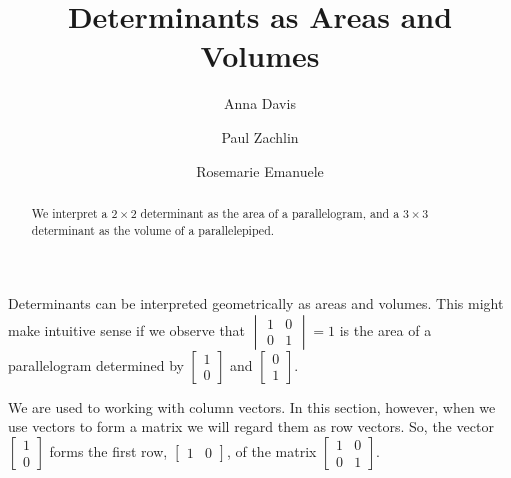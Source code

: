 \documentclass{ximera}
\author{Anna Davis \and Paul Zachlin \and Rosemarie Emanuele} \title{Determinants as Areas and Volumes} \license{CC-BY 4.0}
\begin{document}
\begin{abstract}
 We interpret a $2\times 2$ determinant as the area of a parallelogram, and a $3\times 3$ determinant as the volume of a parallelepiped.
\end{abstract}
\maketitle

Determinants can be interpreted geometrically as areas and volumes.  This might make intuitive sense if we observe that $\begin{vmatrix}1&0\\0&1\end{vmatrix}=1$ is the area of a parallelogram determined by $\begin{bmatrix}1\\0\end{bmatrix}$ and $\begin{bmatrix}0\\1\end{bmatrix}$.    

\begin{image}[1.3in]
\end{image}
We are used to working with column vectors.  In this section, however, when we use vectors to form a matrix we will regard them as row vectors.  So, the vector $\begin{bmatrix}1\\0\end{bmatrix}$ forms the first row, $\begin{bmatrix}1&0\end{bmatrix}$, of the matrix $\begin{bmatrix}1&0\\0&1\end{bmatrix}$.
\end{document}

